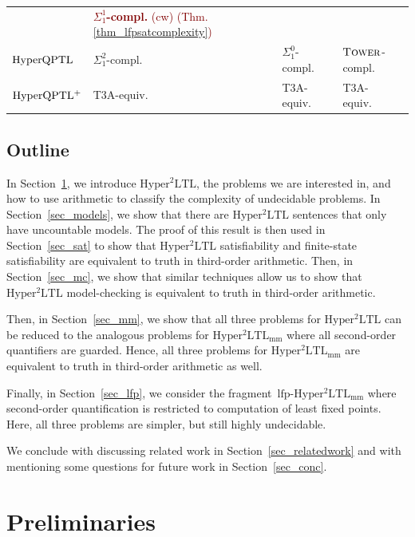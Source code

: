 \documentclass[dvipsnames,10pt,a4paper]{amsart}
\theoremstyle{definition}
\theoremstyle{remark}
\newcommand{\hyqptl}{\mathrm{Hyper\-QPTL}\xspace}
\newcommand{\hyqptlplus}{\mathrm{Hyper\-QPTL^+}\xspace}
\newcommand{\sohyltl}{\mathrm{Hyper^2LTL}\xspace}
\newcommand{\sohyltlfp}{\mathrm{Hyper^2LTL_{\mathrm{mm}}}\xspace}
\newcommand{\lfpsohyltlfp}{\mathrm{lfp\text{-}{Hyper^2LTL_{\mathrm{mm}}}}\xspace}
\newcommand{\tower}{\textsc{Tower}\xspace}
\begin{document}
\begin{table}[h]
\begin{tabular}{llll}
                        & \textcolor{Maroon}{\textbf{\boldmath$\Sigma_1^1$-compl.} (cw) (Thm.\ref{thm_lfpsatcomplexity})} &&\\
        \rowcolor{lightgray!40}$\hyqptl$ &  $\Sigma^2_1$-compl.~\cite{regaud2024complexityhyperqptl} & $\Sigma_1^0$-compl.~\cite{Rabe16diss} & $\tower$-compl.~\cite{Rabe16diss}\\
        $\hyqptlplus$ & T3A-equiv.~\cite{regaud2024complexityhyperqptl} &  T3A-equiv.~\cite{regaud2024complexityhyperqptl} &  T3A-equiv.~\cite{regaud2024complexityhyperqptl}\\
    \end{tabular}
    \label{table_results}
\end{table}


\subsection{Outline}
In Section~\ref{sec:prels}, we introduce $\sohyltl$, the problems we are interested in, and how to use arithmetic to classify the complexity of undecidable problems.
In Section~\ref{sec_models}, we show that there are $\sohyltl$ sentences that only have uncountable models.
The proof of this result is then used in Section~\ref{sec_sat} to show that $\sohyltl$ satisfiability and finite-state satisfiability are equivalent to truth in third-order arithmetic. 
Then, in Section~\ref{sec_mc}, we show that similar techniques allow us to show that $\sohyltl$ model-checking is equivalent to truth in third-order arithmetic.

Then, in Section~\ref{sec_mm}, we show that all three problems for $\sohyltl$ can be reduced to the analogous problems for $\sohyltlfp$ where all second-order quantifiers are guarded. Hence, all three problems for $\sohyltlfp$ are equivalent to truth in third-order arithmetic as well.

Finally, in Section~\ref{sec_lfp}, we consider the fragment~$\lfpsohyltlfp$ where second-order quantification is restricted to computation of least fixed points. Here, all three problems are simpler, but still highly undecidable.

We conclude with discussing related work in Section~\ref{sec_relatedwork} and with mentioning some questions for future work in Section~\ref{sec_conc}.

\section{Preliminaries}
\label{sec:prels}
\end{document}
